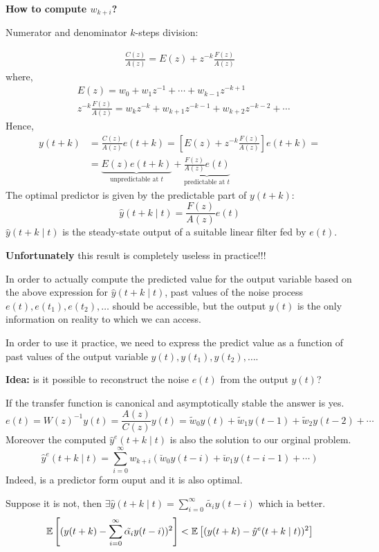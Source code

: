 \textbf{How to compute $w_{k+i}$?}

Numerator and denominator $k$-steps division:

\begin{align*}
	\frac{C(z)}{A(z)}=E(z)+z^{-k} \frac{F(z)}{A(z)}
\end{align*}
where,
\begin{align*}
	&E(z)=w_{0}+w_{1} z^{-1}+\cdots+w_{k-1} z^{-k+1} \\
	&z^{-k} \frac{F(z)}{A(z)}=w_{k} z^{-k}+w_{k+1} z^{-k-1}+w_{k+2} z^{-k-2}+\cdots
\end{align*}
Hence,
\begin{align*}
	y(t+k) &=\frac{C(z)}{A(z)} e(t+k)=\left[E(z)+z^{-k} \frac{F(z)}{A(z)}\right] e(t+k)=\\
	&=\underbrace{E(z)e(t+k)}_{\text{unpredictable at }t}+\underbrace{\frac{F(z)}{A(z)}e(t)}_{\text{predictable at }t}
\end{align*}
The optimal predictor is given by the predictable part of $y(t + k)$:
$$
\hat{y}(t+k \mid t) = \frac{F(z)}{A(z)}e(t)
$$
$\hat{y}(t+k \mid t)$ is the steady-state output of a suitable linear filter 
fed by $e(t)$.

\textbf{Unfortunately} this result is 
completely useless in practice!!! 

In order to actually compute the predicted value for the output 
variable based on the above expression for $\hat{y}(t+k \mid t)$, past values of the noise process $e(t),e(t_1),e(t_2),\ldots$ should be accessible, but the output $y(t)$ is the only 
information on reality to 
which we can access.

In order to use it practice, we need to express the predict value as a 
function of past values of the output variable $y(t), y(t_1), y(t_2),\ldots$.

\textbf{Idea:} is it possible to reconstruct 
the noise $e(t)$ from the output $y(t)$? 

If the transfer function is canonical and asymptotically stable the answer is yes.
$$
e(t)=W(z)^{-1} y(t)=\frac{A(z)}{C(z)} y(t)=\widetilde{w}_{0} y(t)+\widetilde{w}_{1} y(t-1)+\widetilde{w}_{2} y(t-2)+\cdots
$$
Moreover the computed $\hat{y}^e(t+k \mid t)$ is also the solution to our orginal problem.
$$
\hat{y}^e(t+k \mid t)=\sum_{i=0}^{\infty} w_{k+i}\left(\breve{w}_{0} y(t-i)+\breve{w}_{1} y(t-i-1)+\cdots\right)
$$
Indeed, is a predictor form ouput and it is also optimal.

Suppose it is not, then $\exists \hat{y}(t+k \mid t)=\sum_{i=0}^{\infty} \tilde{\alpha_i}y(t-i)$ which ia better.
$$
\mathbb{E}\left[(y(t+k)-\sum_{i=0}^{\infty} \tilde{\alpha_i}y(t-i))^2\right]<\mathbb{E}\left[(y(t+k)-\hat{y}^e(t+k \mid t))^{2}\right]
$$


 